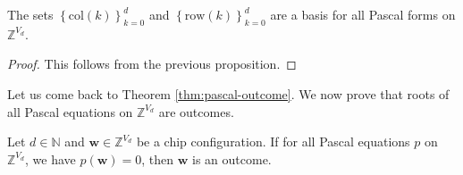 \begin{corollary}\label{cor:pascal-basis-2323}
    The sets \( \left\{ \mathrm{col}(k) \right\}_{k=0}^d \) and \( \left\{ \mathrm{row}(k) \right\}_{k=0}^d \) are a basis for all Pascal forms on \( \mathbb{Z}^{V_d} \). 
\end{corollary}

\begin{proof}
    This follows from the previous proposition.
\end{proof}

Let us come back to Theorem \ref{thm:pascal-outcome}. We now prove that roots of all Pascal equations on \( \mathbb{Z}^{V_d} \) are outcomes.

\begin{proposition}\label{thm:pascal-outcome-converse}
    Let \( d \in \mathbb{N} \) and \( \mathbf{w}\in \mathbb{Z}^{V_d} \) be a chip configuration. If for all Pascal equations \( p \) on \( \mathbb{Z}^{V_d} \), we have \( p(\mathbf w) = 0 \), then \( \mathbf{w} \) is an outcome.
\end{proposition}

